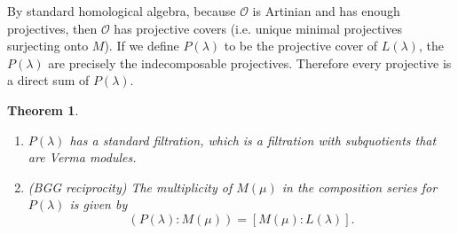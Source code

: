\documentclass[leqno, openany]{memoir}
\newtheorem{thm}{Theorem}[section]
\theoremstyle{definition}
\theoremstyle{remark}
\theoremstyle{plain}
\theoremstyle{definition}
\theoremstyle{remark}
\newcommand{\cO}{\mathcal{O}}
\begin{document}
By standard homological algebra, because $\cO$ is Artinian and has enough projectives, then $\cO$ has projective covers (i.e. unique minimal projectives surjecting onto $M$). If we define $P(\lambda)$ to be the projective cover of $L(\lambda)$, the $P(\lambda)$ are precisely the indecomposable projectives. Therefore every projective is a direct sum of $P(\lambda)$.

\begin{thm}\leavevmode
    \begin{enumerate}
        \item $P(\lambda)$ has a standard filtration, which is a filtration with subquotients that are Verma modules. 
        \item (BGG reciprocity) The multiplicity of $M(\mu)$ in the composition series for $P(\lambda)$ is given by 
            \[ (P(\lambda):M(\mu)) = [M(\mu):L(\lambda)]. \]
    \end{enumerate}
\end{thm}
\end{document}
